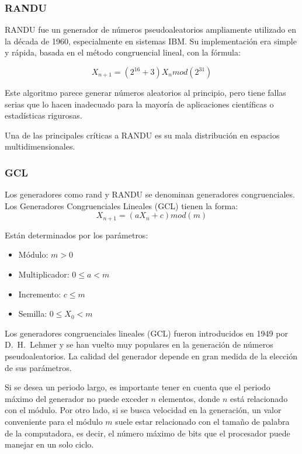 \documentclass{article}
\begin{document}
\subsubsection{RANDU}
RANDU fue un generador de números pseudoaleatorios ampliamente utilizado en la década de 1960, especialmente en sistemas IBM. Su implementación era simple y rápida, basada en el método congruencial lineal, con la fórmula:

\begin{equation}
    X_{n+1} = (2^{16} + 3)X_n mod(2^{31})
\end{equation}

Este algoritmo parece generar números aleatorios al principio, pero tiene fallas serias que lo hacen inadecuado para la mayoría de aplicaciones científicas o estadísticas rigurosas.

Una de las principales críticas a RANDU es su mala distribución en espacios multidimensionales. 

\subsubsection{GCL}

Los generadores como rand y RANDU se denominan generadores congruenciales. Los Generadores Congruenciales Lineales (GCL) tienen la forma:
\begin{equation}
    X_{n+1} = (aX_n + c)mod(m)
\end{equation}

Están determinados por los parámetros: 
\begin{itemize}
    \item Módulo: $m>0$ 
    \item Multiplicador: $0 \leq a < m$
    \item Incremento: $c \leq m$
    \item Semilla: $0 \leq X_0 < m$
\end{itemize}

Los generadores congruenciales lineales (GCL) fueron introducidos en 1949 por D.~H.~Lehmer y se han vuelto muy populares en la generación de números pseudoaleatorios. La calidad del generador depende en gran medida de la elección de sus parámetros.

Si se desea un periodo largo, es importante tener en cuenta que el periodo máximo del generador no puede exceder \( n \) elementos, donde \( n \) está relacionado con el módulo. Por otro lado, si se busca velocidad en la generación, un valor conveniente para el módulo \( m \) suele estar relacionado con el tamaño de palabra de la computadora, es decir, el número máximo de bits que el procesador puede manejar en un solo ciclo.
\end{document}
